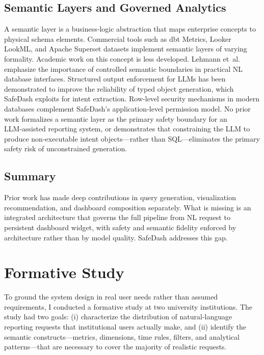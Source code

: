 \documentclass[11pt]{article}
\begin{document}
\subsection{Semantic Layers and Governed Analytics}
A semantic layer is a business‑logic abstraction that maps enterprise concepts to physical schema elements. Commercial tools such as dbt Metrics, Looker LookML, and Apache Superset datasets implement semantic layers of varying formality. Academic work on this concept is less developed. Lehmann et~al.~\cite{lehmann2022building} emphasize the importance of controlled semantic boundaries in practical NL database interfaces. Structured output enforcement for LLMs\cite{openai2024structured} has been demonstrated to improve the reliability of typed object generation, which SafeDash exploits for intent extraction. Row‑level security mechanisms in modern databases\cite{postgresql} complement SafeDash's application‑level permission model. No prior work formalizes a semantic layer as the primary safety boundary for an LLM‑assisted reporting system, or demonstrates that constraining the LLM to produce non‑executable intent objects—rather than SQL—eliminates the primary safety risk of unconstrained generation.

\subsection{Summary}
Prior work has made deep contributions in query generation, visualization recommendation, and dashboard composition separately. What is missing is an integrated architecture that governs the full pipeline from NL request to persistent dashboard widget, with safety and semantic fidelity enforced by architecture rather than by model quality. SafeDash addresses this gap.

\section{Formative Study\label{sec:formative}}
To ground the system design in real user needs rather than assumed requirements, I conducted a formative study at two university institutions. The study had two goals: (i) characterize the distribution of natural‑language reporting requests that institutional users actually make, and (ii) identify the semantic constructs—metrics, dimensions, time rules, filters, and analytical patterns—that are necessary to cover the majority of realistic requests.
\end{document}
